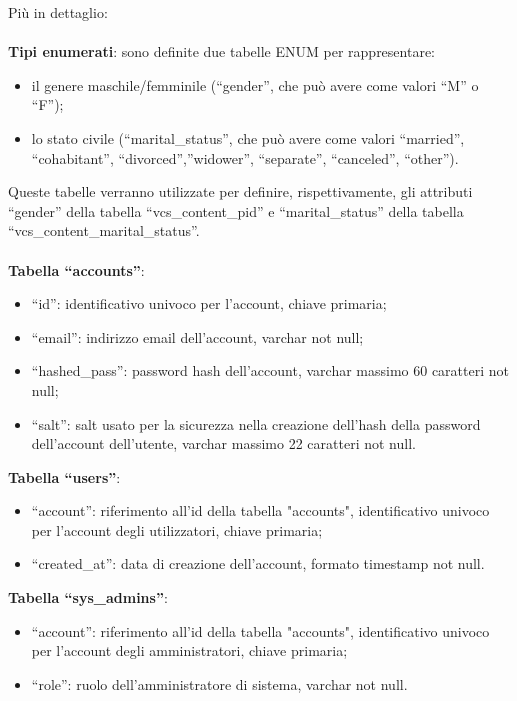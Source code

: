 Più in dettaglio:\\\\
\textbf{Tipi enumerati}: sono definite due tabelle ENUM per rappresentare:
\begin{itemize}
    \item il genere maschile/femminile (“gender”, che può avere come valori “M” o “F”);
    \item lo stato civile (“marital\_status”, che può avere come valori “married”, “cohabitant”, “divorced”,”widower”, “separate”, “canceled”, “other”).
\end{itemize}
Queste tabelle verranno utilizzate per definire, rispettivamente, gli attributi “gender” della tabella “vcs\_content\_pid” e “marital\_status” della tabella “vcs\_content\_marital\_status”.\\\\

\textbf{Tabella “accounts”}:
\begin{itemize}
    \item “id”: identificativo univoco per l’account, chiave primaria; 
    \item “email”: indirizzo email dell’account, varchar not null;
    \item “hashed\_pass”: password hash dell’account, varchar massimo 60 caratteri not null;
    \item “salt”: salt usato per la sicurezza nella creazione dell’hash della password dell’account dell’utente, varchar massimo 22 caratteri not null.
\end{itemize}

\textbf{Tabella “users”}:
\begin{itemize}
    \item “account”: riferimento all'id della tabella "accounts", identificativo univoco per l’account degli utilizzatori,  chiave primaria;
    \item “created\_at”: data di creazione dell’account, formato timestamp not null. 
\end{itemize}

\textbf{Tabella “sys\_admins”}:
\begin{itemize}
    \item “account”: riferimento all'id della tabella "accounts", identificativo univoco per l’account degli amministratori,  chiave primaria; 
    \item “role”: ruolo dell'amministratore di sistema, varchar not null.
\end{itemize}

